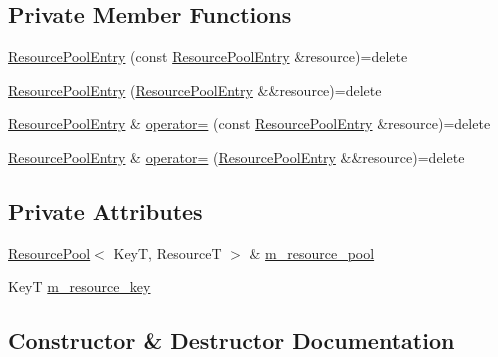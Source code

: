 \subsection*{Private Member Functions}
\begin{DoxyCompactItemize}
\item 
\hyperlink{structmage_1_1_resource_pool_1_1_resource_pool_entry_a10ba1bc114b97a82fc957b17c3bef56e}{Resource\+Pool\+Entry} (const \hyperlink{structmage_1_1_resource_pool_1_1_resource_pool_entry}{Resource\+Pool\+Entry} \&resource)=delete
\item 
\hyperlink{structmage_1_1_resource_pool_1_1_resource_pool_entry_a7e97168b2d81c76dd6dbd6d7037a6243}{Resource\+Pool\+Entry} (\hyperlink{structmage_1_1_resource_pool_1_1_resource_pool_entry}{Resource\+Pool\+Entry} \&\&resource)=delete
\item 
\hyperlink{structmage_1_1_resource_pool_1_1_resource_pool_entry}{Resource\+Pool\+Entry} \& \hyperlink{structmage_1_1_resource_pool_1_1_resource_pool_entry_a2a08bf48f2dce191a23f088530879ca0}{operator=} (const \hyperlink{structmage_1_1_resource_pool_1_1_resource_pool_entry}{Resource\+Pool\+Entry} \&resource)=delete
\item 
\hyperlink{structmage_1_1_resource_pool_1_1_resource_pool_entry}{Resource\+Pool\+Entry} \& \hyperlink{structmage_1_1_resource_pool_1_1_resource_pool_entry_ab9de5fdfecd8e19a510541b9353fe854}{operator=} (\hyperlink{structmage_1_1_resource_pool_1_1_resource_pool_entry}{Resource\+Pool\+Entry} \&\&resource)=delete
\end{DoxyCompactItemize}
\subsection*{Private Attributes}
\begin{DoxyCompactItemize}
\item 
\hyperlink{classmage_1_1_resource_pool}{Resource\+Pool}$<$ KeyT, ResourceT $>$ \& \hyperlink{structmage_1_1_resource_pool_1_1_resource_pool_entry_a657a97767707dbb045f49440dff4c126}{m\+\_\+resource\+\_\+pool}
\item 
KeyT \hyperlink{structmage_1_1_resource_pool_1_1_resource_pool_entry_a2ca0b2ee479f64dbec5288a9a8b2b4c9}{m\+\_\+resource\+\_\+key}
\end{DoxyCompactItemize}


\subsection{Constructor \& Destructor Documentation}
\hypertarget{structmage_1_1_resource_pool_1_1_resource_pool_entry_a8e255033a6f139f5f30e17869325eb2e}{}\label{structmage_1_1_resource_pool_1_1_resource_pool_entry_a8e255033a6f139f5f30e17869325eb2e} 
